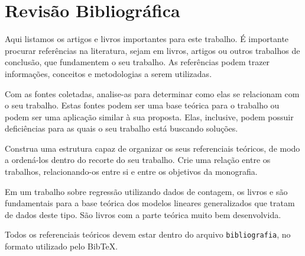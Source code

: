 \chapter{Revisão Bibliográfica}\label{revisaobibliografica}

Aqui listamos os artigos e livros importantes para este trabalho. É importante procurar referências na literatura, sejam em livros, artigos ou outros trabalhos de conclusão, que fundamentem o seu trabalho. As referências podem trazer informações, conceitos e metodologias a serem utilizadas.

Com as fontes coletadas, analise-as para determinar como elas se relacionam com o seu trabalho. Estas fontes podem ser uma base teórica para o trabalho ou podem ser uma aplicação similar à sua proposta. Elas, inclusive, podem possuir deficiências para as quais o seu trabalho está buscando soluções.

Construa uma estrutura capaz de organizar os seus referenciais teóricos, de modo a ordená-los dentro do recorte do seu trabalho. Crie uma relação entre os trabalhos, relacionando-os entre si e entre os objetivos da monografia.

Em um trabalho sobre regressão utilizando dados de contagem, os livros  e  são fundamentais para a base teórica dos modelos lineares generalizados que tratam de dados deste tipo. São livros com a parte teórica muito bem desenvolvida. 

Todos os referenciais teóricos devem estar dentro do arquivo \texttt{bibliografia}, no formato utilizado pelo BibTeX.  


